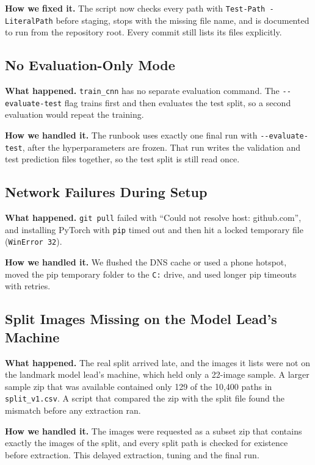 \textbf{How we fixed it.} The script now checks every path with \texttt{Test-Path -LiteralPath} before staging, stops with the missing file name, and is documented to run from the repository root. Every commit still lists its files explicitly.

\subsection{No Evaluation-Only Mode}
\label{sec:challenge-eval-only}

\textbf{What happened.} \texttt{train\_cnn} has no separate evaluation command. The \texttt{-{}-evaluate-test} flag trains first and then evaluates the test split, so a second evaluation would repeat the training.

\textbf{How we handled it.} The runbook uses exactly one final run with \texttt{-{}-evaluate-test}, after the hyperparameters are frozen. That run writes the validation and test prediction files together, so the test split is still read once.

\subsection{Network Failures During Setup}
\label{sec:challenge-network}

\textbf{What happened.} \texttt{git pull} failed with ``Could not resolve host: github.com'', and installing PyTorch with \texttt{pip} timed out and then hit a locked temporary file (\texttt{WinError 32}).

\textbf{How we handled it.} We flushed the DNS cache or used a phone hotspot, moved the pip temporary folder to the \texttt{C:} drive, and used longer pip timeouts with retries.

\subsection{Split Images Missing on the Model Lead's Machine}
\label{sec:challenge-missing-images}

\textbf{What happened.} The real split arrived late, and the images it lists were not on the landmark model lead's machine, which held only a 22-image sample. A larger sample zip that was available contained only 129 of the 10{,}400 paths in \texttt{split\_v1.csv}. A script that compared the zip with the split file found the mismatch before any extraction ran.

\textbf{How we handled it.} The images were requested as a subset zip that contains exactly the images of the split, and every split path is checked for existence before extraction. This delayed extraction, tuning and the final run.

